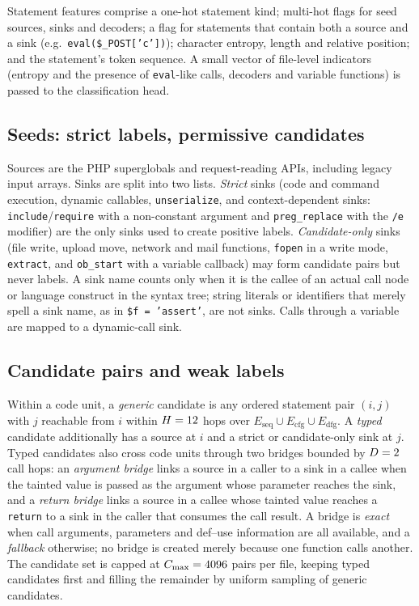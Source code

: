 \documentclass[pdflatex,sn-mathphys-num]{sn-jnl}
\begin{document}
Statement features comprise a one-hot statement kind; multi-hot flags for seed
sources, sinks and decoders; a flag for statements that contain both a source
and a sink (e.g.\ \texttt{eval(\$\_POST['c'])}); character entropy, length and
relative position; and the statement's token sequence. A small vector of
file-level indicators (entropy and the presence of \texttt{eval}-like calls,
decoders and variable functions) is passed to the classification head.

\subsection{Seeds: strict labels, permissive candidates}\label{sec:seeds}
Sources are the PHP superglobals and request-reading APIs, including legacy
input arrays. Sinks are split into two lists. \emph{Strict} sinks (code and
command execution, dynamic callables, \texttt{unserialize}, and
context-dependent sinks: \texttt{include}/\texttt{require} with a non-constant
argument and \texttt{preg\_replace} with the \texttt{/e} modifier) are the only
sinks used to create positive labels. \emph{Candidate-only} sinks (file write,
upload move, network and mail functions, \texttt{fopen} in a write mode,
\texttt{extract}, and \texttt{ob\_start} with a variable callback) may form
candidate pairs but never labels. A sink name counts only when it is the callee
of an actual call node or language construct in the syntax tree; string
literals or identifiers that merely spell a sink name, as in
\texttt{\$f = 'assert'}, are not sinks. Calls through a variable are mapped to
a dynamic-call sink.

\subsection{Candidate pairs and weak labels}\label{sec:cands}
Within a code unit, a \emph{generic} candidate is any ordered statement pair
$(i,j)$ with $j$ reachable from $i$ within $H=12$ hops over
$E_{\text{seq}}\cup E_{\text{cfg}}\cup E_{\text{dfg}}$. A \emph{typed}
candidate additionally has a source at $i$ and a strict or candidate-only sink
at $j$. Typed candidates also cross code units through two bridges bounded by
$D=2$ call hops: an \emph{argument bridge} links a source in a
caller to a sink in a callee when the tainted value is passed as the argument
whose parameter reaches the sink, and a \emph{return bridge} links a source in
a callee whose tainted value reaches a \texttt{return} to a sink in the caller
that consumes the call result. A bridge is \emph{exact} when call arguments,
parameters and def--use information are all available, and a \emph{fallback}
otherwise; no bridge is created merely because one function calls another. The
candidate set is capped at $C_{\max}=4096$ pairs per file, keeping typed
candidates first and filling the remainder by uniform sampling of generic
candidates.
\end{document}
